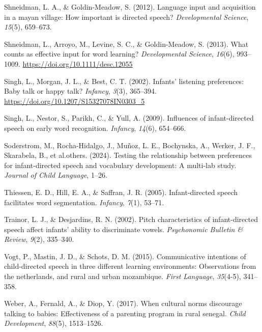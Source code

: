 \documentclass[
  ,man,floatsintext]{apa6}
\newlength{\cslhangindent}
\newlength{\cslentryspacingunit} %
\newenvironment{CSLReferences}[2] %
 {%
  \setlength{\parindent}{0pt}
  \ifodd #1
  \let\oldpar\par
  \def\par{\hangindent=\cslhangindent\oldpar}
  \fi
  \setlength{\parskip}{#2\cslentryspacingunit}
 }%
 {}
\begin{document}
\begin{CSLReferences}{1}{0}
\leavevmode{}%
Shneidman, L. A., \& Goldin-Meadow, S. (2012). Language input and acquisition in a mayan village: How important is directed speech? \emph{Developmental Science}, \emph{15}(5), 659--673.

\leavevmode{}%
Shneidman, L., Arroyo, M., Levine, S. C., \& Goldin-Meadow, S. (2013). What counts as effective input for word learning? \emph{Developmental Science}, \emph{16}(6), 993--1009. \url{https://doi.org/10.1111/desc.12055}

\leavevmode{}%
Singh, L., Morgan, J. L., \& Best, C. T. (2002). Infants' listening preferences: Baby talk or happy talk? \emph{Infancy}, \emph{3}(3), 365--394. \url{https://doi.org/10.1207/S15327078IN0303_5}

\leavevmode{}%
Singh, L., Nestor, S., Parikh, C., \& Yull, A. (2009). Influences of infant-directed speech on early word recognition. \emph{Infancy}, \emph{14}(6), 654--666.

\leavevmode{}%
Soderstrom, M., Rocha-Hidalgo, J., Muñoz, L. E., Bochynska, A., Werker, J. F., Skarabela, B., et al.others. (2024). Testing the relationship between preferences for infant-directed speech and vocabulary development: A multi-lab study. \emph{Journal of Child Language}, 1--26.

\leavevmode{}%
Thiessen, E. D., Hill, E. A., \& Saffran, J. R. (2005). Infant-directed speech facilitates word segmentation. \emph{Infancy}, \emph{7}(1), 53--71.

\leavevmode{}%
Trainor, L. J., \& Desjardins, R. N. (2002). Pitch characteristics of infant-directed speech affect infants' ability to discriminate vowels. \emph{Psychonomic Bulletin \& Review}, \emph{9}(2), 335--340.

\leavevmode{}%
Vogt, P., Mastin, J. D., \& Schots, D. M. (2015). Communicative intentions of child-directed speech in three different learning environments: Observations from the netherlands, and rural and urban mozambique. \emph{First Language}, \emph{35}(4-5), 341--358.

\leavevmode{}%
Weber, A., Fernald, A., \& Diop, Y. (2017). When cultural norms discourage talking to babies: Effectiveness of a parenting program in rural senegal. \emph{Child Development}, \emph{88}(5), 1513--1526.


\end{CSLReferences}
\end{document}
